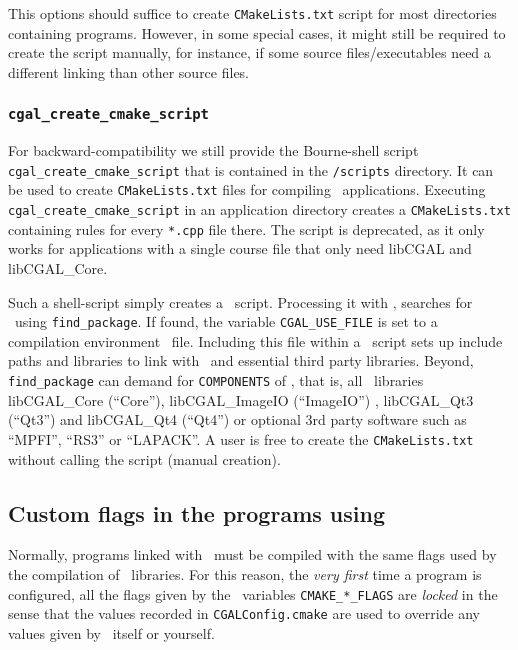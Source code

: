 This options should suffice to create \texttt{CMakeLists.txt} script
for most directories containing programs. However, in some special
cases, it might still be required to create the script manually, for
instance, if some source files/executables need a different linking than
other source files. 

\begin{ccDeprecated}
\subsubsection{\texttt{cgal\_create\_cmake\_script\label{sec:create_cgal_cmake_script}}}

For backward-compatibility we still provide the 
Bourne-shell script \texttt{cgal\_create\_cmake\_script} that 
is contained in the
\texttt{\cgalrel/scripts} directory. It can be used to create
\texttt{CMakeLists.txt} files for compiling \cgal\ applications. Executing
\texttt{cgal\_create\_cmake\_script} in an application directory creates a
\texttt{CMakeLists.txt} containing rules for every \texttt{*.cpp} file
there. The script is deprecated, as it only works for applications 
with a single course file that only need libCGAL and libCGAL\_Core.
\end{ccDeprecated}

Such a shell-script simply creates a \cmake\ script. Processing it
with \cmake, searches for \cgal\ using \texttt{find\_package}. If found,
the variable \texttt{CGAL\_USE\_FILE} is set to a compilation environment \cmake\ file. Including
this file within a \cmake\ script sets up include paths and libraries to
link with \cgal\ and essential third party libraries. Beyond,
\texttt{find\_package} can demand for \texttt{COMPONENTS} of \cgal,
that is, all \cgal\ libraries libCGAL\_Core (``Core''),
libCGAL\_ImageIO (``ImageIO'') , libCGAL\_Qt3 (``Qt3'') and libCGAL\_Qt4
(``Qt4'') or optional 3rd party software such as ``MPFI'', ``RS3'' or
``LAPACK''. A user is free to create the \texttt{CMakeLists.txt}
without calling the script (manual creation).


\subsection{Custom flags in the programs using \cgal}

Normally, programs linked with \cgal\ must be compiled with the same flags
used by the compilation of \cgal\
libraries. For this reason, the \emph{very first} time
a program is configured, all the flags given by the \cmake\ variables \texttt{CMAKE\_*\_FLAGS}
are \emph{locked} in the sense that the values recorded in \texttt{CGALConfig.cmake} 
are used to override any values given by \cmake\ itself or yourself.

